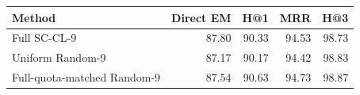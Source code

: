 \begin{tabular}{lrrrr}
\toprule
Method & Direct EM & H@1 & MRR & H@3 \\
\midrule
Full SC-CL-9 & 87.80 & 90.33 & 94.53 & 98.73 \\
Uniform Random-9 & 87.17 & 90.17 & 94.42 & 98.83 \\
Full-quota-matched Random-9 & 87.54 & 90.63 & 94.73 & 98.87 \\
\bottomrule
\end{tabular}
